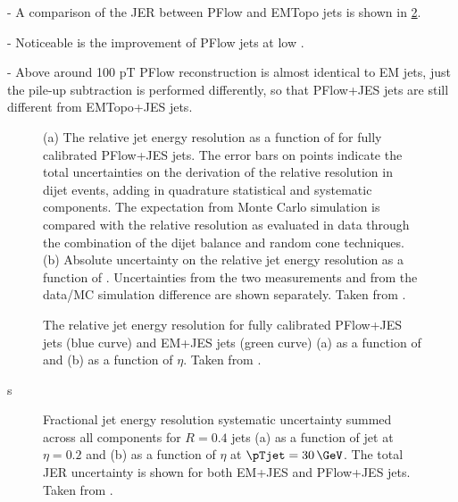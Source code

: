 - A comparison of the JER between PFlow and EMTopo jets is shown in \cref{fig:jer-combination-results}.

- Noticeable is the improvement of PFlow jets at low \pT.

- Above around 100 pT PFlow reconstruction is almost identical to EM jets, just the pile-up subtraction is performed differently, so that PFlow+JES jets are still different from EMTopo+JES jets.



\FloatBarrier
\begin{figure}
    \caption{(a) The relative jet energy resolution as a function of \pT for fully calibrated PFlow+JES jets. The error bars on points indicate the total uncertainties on the derivation of the relative resolution in dijet events, adding in quadrature statistical and systematic components. The expectation from Monte Carlo simulation is compared with the relative resolution as evaluated in data through the combination of the dijet balance and random cone techniques. (b) Absolute uncertainty on the relative jet energy resolution as a function of \pTjet. Uncertainties from the two \insitu measurements and from the data/MC simulation difference are shown separately. Taken from .}
    \label{fig:jer-combination-incl-noise-term}
\end{figure}



\begin{figure}
    \caption{The relative jet energy resolution for fully calibrated PFlow+JES jets (blue curve) and EM+JES jets (green curve) (a) as a function of \pTjet and (b) as a function of $\eta$. Taken from .}
    \label{fig:jer-combination-results}
\end{figure}


s
\begin{figure}
    \caption{Fractional jet energy resolution systematic uncertainty summed across all components for \antikt $R = 0.4$ jets (a) as a function of jet \pTjet at $\eta = 0.2$ and (b) as a function of $\eta$ at $\pTjet = 30\,\GeV$. The total JER uncertainty is shown for both EM+JES and PFlow+JES jets. Taken from .}
    \label{fig:jer-combination-uncertainties}
\end{figure}



